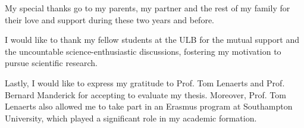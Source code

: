 My special thanks go to my parents, my partner and the rest of my family for
their love and support during these two years and before.

I would like to thank my fellow students at the ULB for the mutual support and
the uncountable science-enthusiastic discussions, fostering my motivation to
pursue scientific research.

Lastly, I would like to express my gratitude to Prof. Tom Lenaerts and Prof.
Bernard Manderick for accepting to evaluate my thesis. Moreover, Prof. Tom
Lenaerts also allowed me to take part in an Erasmus program at Southampton
University, which played a significant role in my academic formation.

\clearpage

\tableofcontents*
